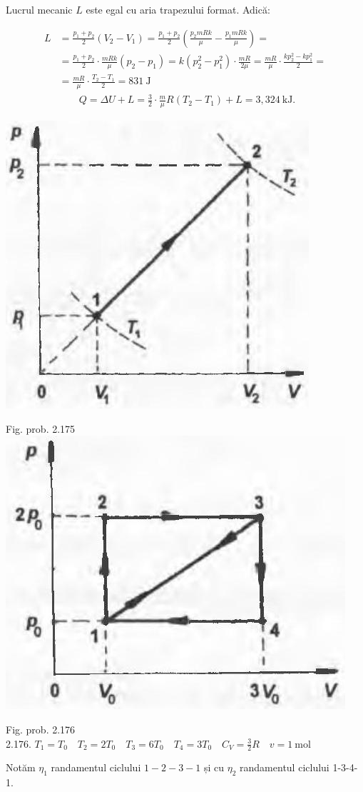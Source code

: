 Lucrul mecanic $L$ este egal cu aria trapezului format. Adică:

$$
\begin{aligned}
L & =\frac{p_{1}+p_{2}}{2}\left(V_{2}-V_{1}\right)=\frac{p_{1}+p_{2}}{2}\left(\frac{p_{2} m R k}{\mu}-\frac{p_{1} m R k}{\mu}\right)= \\
& =\frac{p_{1}+p_{2}}{2} \cdot \frac{m R k}{\mu}\left(p_{2}-p_{1}\right)=k\left(p_{2}^{2}-p_{1}^{2}\right) \cdot \frac{m R}{2 \mu}=\frac{m R}{\mu} \cdot \frac{k p_{2}^{2}-k p_{1}^{2}}{2}= \\
& =\frac{m R}{\mu} \cdot \frac{T_{2}-T_{1}}{2}=831 \mathrm{~J} \\
& \quad \quad Q=\Delta U+L=\frac{3}{2} \cdot \frac{m}{\mu} R\left(T_{2}-T_{1}\right)+L=3,324 \mathrm{~kJ} .
\end{aligned}
$$

\begin{center}
\includegraphics[width=0.4\linewidth]{images/2025_07_01_5b3ff9fa0d508c8e9f17g-307(1)}
\end{center}

Fig. prob. 2.175\\
\includegraphics[width=0.4\linewidth]{images/2025_07_01_5b3ff9fa0d508c8e9f17g-307}

Fig. prob. 2.176\\
2.176. $T_{1}=T_{0} \quad T_{2}=2 T_{0} \quad T_{3}=6 T_{0} \quad T_{4}=3 T_{0} \quad C_{V}=\frac{3}{2} R \quad v=1 \mathrm{~mol}$

Notăm $\eta_{1}$ randamentul ciclului $1-2-3-1$ și cu $\eta_{2}$ randamentul ciclului 1-3-4-1.


